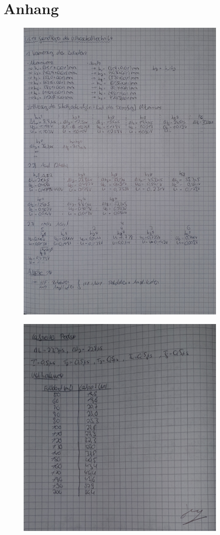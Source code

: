 \section{Anhang}

\begin{figure}
    \centering
    \includegraphics[width=0.9\textwidth]{content/Laborbuch1.jpg}
\end{figure}

\begin{figure}
    \centering
    \includegraphics[width=0.9\textwidth]{content/Laborbuch2.jpg}
\end{figure}

%

